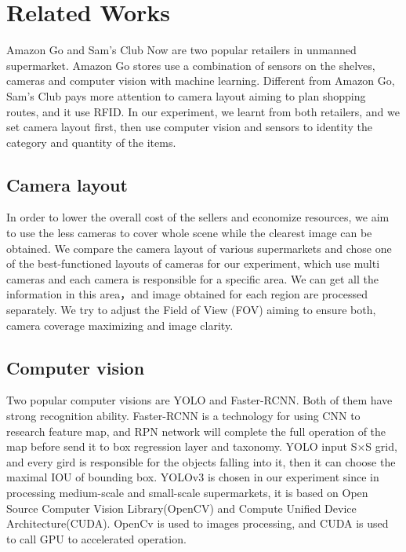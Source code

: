 \section{Related Works}
\label{sec:rw}

Amazon Go and Sam's Club Now are two popular retailers in unmanned supermarket.
Amazon Go stores use a combination of sensors on the shelves, cameras and computer vision with machine learning.
Different from Amazon Go, Sam's Club  pays more attention to camera layout aiming to plan shopping routes, and it use RFID\cite{1192765}.
In our experiment, we learnt from both retailers, and we set camera layout first, then use computer vision and sensors to identity the category and quantity of the items.

\subsection{Camera layout}

In order to lower the overall cost of the sellers and economize resources, we aim to use the less cameras to cover whole scene while  the clearest image can be obtained.
We compare the camera layout of various supermarkets and chose one of the best-functioned layouts of cameras for our experiment, which use multi cameras and each camera is responsible for a specific area.
We can get all the information in this area，and image obtained for each region are processed separately\cite{}.
We try to adjust the Field of View (FOV) aiming to ensure both, camera coverage maximizing and image clarity\cite{ERDEM2006156}.

\subsection{Computer vision}
Two popular computer visions are YOLO and Faster-RCNN\cite{NIPS2015_5638}\cite{yolov3}.
Both of them have strong recognition ability. Faster-RCNN is a technology for using CNN to research feature map, and RPN network will complete the full operation of the map before send it to box regression layer and taxonomy\cite{NIPS2015_5638}.
YOLO input S×S grid, and every gird is responsible for the objects falling into it, then it can choose the maximal IOU of bounding box\cite{yolov3}.
YOLOv3 is chosen in our experiment since in processing medium-scale and small-scale supermarkets, it is based on Open Source Computer Vision Library(OpenCV) and Compute Unified Device Architecture(CUDA).
OpenCv is used to images processing, and CUDA is used to call GPU to accelerated operation.

